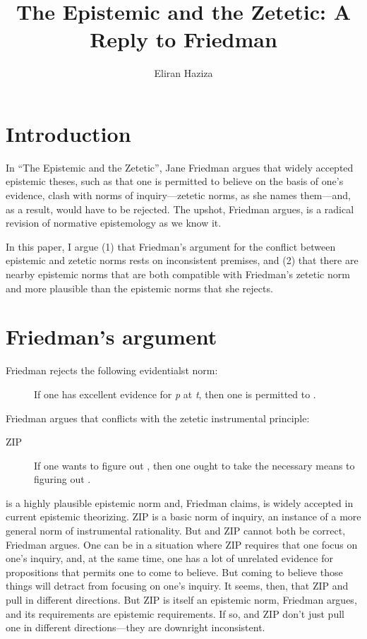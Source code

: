 \documentclass[12pt]{article}
\title{The Epistemic and the Zetetic: A Reply to Friedman}
\author{Eliran Haziza}
\begin{document}
\maketitle

\section{Introduction}

In ``The Epistemic and the Zetetic'', Jane Friedman argues that widely accepted epistemic theses, such as that one is permitted to believe on the basis of one's evidence, clash with norms of inquiry---zetetic norms, as she names them---and, as a result, would have to be rejected. The upshot, Friedman argues, is a radical revision of normative epistemology as we know it.

In this paper, I argue (1) that Friedman's argument for the conflict between epistemic and zetetic norms rests on inconsistent premises, and (2) that there are nearby epistemic norms that are both compatible with Friedman's zetetic norm and more plausible than the epistemic norms that she rejects.

\section{Friedman's argument}\label{sec:2}

Friedman rejects the following evidentialst norm:

\begin{description}
    \item[\ep] If one has excellent evidence for \textit{p} at \textit{t}, then one is permitted to \jud{}.
\end{description}
%
Friedman argues that \ep{} conflicts with the zetetic instrumental principle:
%
\begin{description}
    \item[ZIP] If one wants to figure out , then one ought to take the necessary means to figuring out .
\end{description}
%
\ep{} is a highly plausible epistemic norm and, Friedman claims, is widely accepted in current epistemic theorizing. ZIP is a basic norm of inquiry, an instance of a more general norm of instrumental rationality. But \ep{} and ZIP cannot both be correct, Friedman argues. One can be in a situation where ZIP requires that one focus on one’s inquiry, and, at the same time, one has a lot of unrelated evidence for propositions that \ep{} permits one to come to believe. But coming to believe those things will detract from focusing on one’s inquiry. It seems, then, that ZIP and \ep{} pull in different directions. But ZIP is itself an epistemic norm, Friedman argues, and its requirements are epistemic requirements. If so, \ep{} and ZIP don’t just pull one in different directions---they are downright inconsistent.
\end{document}
